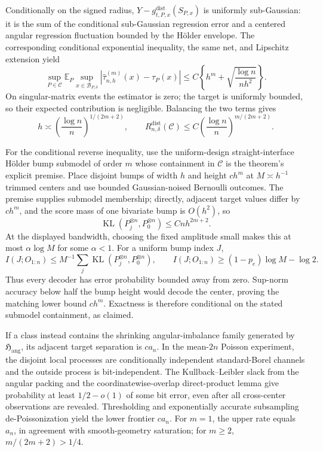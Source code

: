 Conditionally on the signed radius, \(Y-g^{\mathrm{dist}}_{t,P,x}(S_{P,x})\) is uniformly sub-Gaussian: it is the sum of the conditional sub-Gaussian regression error and a centered angular regression fluctuation bounded by the H\"older envelope.  The corresponding conditional exponential inequality, the same net, and Lipschitz extension yield
\[
 \sup_{P\in\mathcal C}\mathbb E_P\sup_{x\in\mathcal B_{P,\delta}}
 |\widehat\tau^{(m)}_{n,h}(x)-\tau_P(x)|
 \leq C\left\{h^m+\sqrt{\frac{\log n}{nh^2}}\right\}.
\]
On singular-matrix events the estimator is zero; the target is uniformly bounded, so their expected contribution is negligible.  Balancing the two terms gives
\[
 h\asymp\left(\frac{\log n}{n}\right)^{1/(2m+2)},
 \qquad
 R_{n,\delta}^{\mathrm{dist}}(\mathcal C)
 \leq C\left(\frac{\log n}{n}\right)^{m/(2m+2)}.
\]

For the conditional reverse inequality, use the uniform-design straight-interface H\"older bump submodel of order \(m\) whose containment in \(\mathcal C\) is the theorem's explicit premise.  Place disjoint bumps of width \(h\) and height \(ch^m\) at \(M\asymp h^{-1}\) trimmed centers and use bounded Gaussian-noised Bernoulli outcomes.  The premise supplies submodel membership; directly, adjacent target values differ by \(ch^m\), and the score mass of one bivariate bump is \(O(h^2)\), so
\[
 \operatorname{KL}(P_j^{\otimes n},P_0^{\otimes n})\leq Cnh^{2m+2}.
\]
At the displayed bandwidth, choosing the fixed amplitude small makes this at most \(\alpha\log M\) for some \(\alpha<1\).  For a uniform bump index \(J\),
\[
 I(J;O_{1:n})\leq M^{-1}\sum_j\operatorname{KL}(P_j^{\otimes n},P_0^{\otimes n}),
 \qquad
 I(J;O_{1:n})\geq(1-p_e)\log M-\log2.
\]
Thus every decoder has error probability bounded away from zero.  Sup-norm accuracy below half the bump height would decode the center, proving the matching lower bound \(ch^m\).  Exactness is therefore conditional on the stated submodel containment, as claimed.

If a class instead contains the shrinking angular-imbalance family generated by \(\mathfrak H_{\mathrm{ang}}\), its adjacent target separation is \(ca_n\).  In the mean-\(2n\) Poisson experiment, the disjoint local processes are conditionally independent standard-Borel channels and the outside process is bit-independent.  The Kullback--Leibler slack from the angular packing and the coordinatewise-overlap direct-product lemma give probability at least \(1/2-o(1)\) of some bit error, even after all cross-center observations are revealed.  Thresholding and exponentially accurate subsampling de-Poissonization yield the lower frontier \(ca_n\).  For \(m=1\), the upper rate equals \(a_n\), in agreement with smooth-geometry saturation; for \(m\geq2\), \(m/(2m+2)>1/4\).

